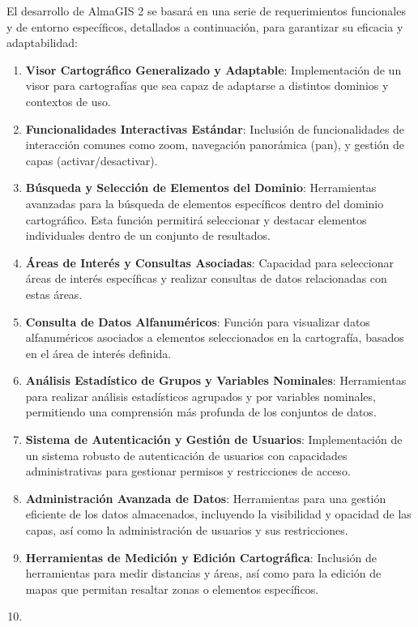El desarrollo de AlmaGIS 2 se basará en una serie de requerimientos
funcionales y de entorno específicos, detallados a continuación, para
garantizar su eficacia y adaptabilidad:

\begin{enumerate}
\def\labelenumi{\arabic{enumi}.}
\item
  \textbf{Visor Cartográfico Generalizado y Adaptable}: Implementación
  de un visor para cartografías que sea capaz de adaptarse a distintos
  dominios y contextos de uso.
\item
  \textbf{Funcionalidades Interactivas Estándar}: Inclusión de
  funcionalidades de interacción comunes como zoom, navegación
  panorámica (pan), y gestión de capas (activar/desactivar).
\item
  \textbf{Búsqueda y Selección de Elementos del Dominio}: Herramientas
  avanzadas para la búsqueda de elementos específicos dentro del dominio
  cartográfico. Esta función permitirá seleccionar y destacar elementos
  individuales dentro de un conjunto de resultados.
\item
  \textbf{Áreas de Interés y Consultas Asociadas}: Capacidad para
  seleccionar áreas de interés específicas y realizar consultas de datos
  relacionadas con estas áreas.
\item
  \textbf{Consulta de Datos Alfanuméricos}: Función para visualizar
  datos alfanuméricos asociados a elementos seleccionados en la
  cartografía, basados en el área de interés definida.
\item
  \textbf{Análisis Estadístico de Grupos y Variables Nominales}:
  Herramientas para realizar análisis estadísticos agrupados y por
  variables nominales, permitiendo una comprensión más profunda de los
  conjuntos de datos.
\item
  \textbf{Sistema de Autenticación y Gestión de Usuarios}:
  Implementación de un sistema robusto de autenticación de usuarios con
  capacidades administrativas para gestionar permisos y restricciones de
  acceso.
\item
  \textbf{Administración Avanzada de Datos}: Herramientas para una
  gestión eficiente de los datos almacenados, incluyendo la visibilidad
  y opacidad de las capas, así como la administración de usuarios y sus
  restricciones.
\item
  \textbf{Herramientas de Medición y Edición Cartográfica}: Inclusión de
  herramientas para medir distancias y áreas, así como para la edición
  de mapas que permitan resaltar zonas o elementos específicos.
\item

\end{enumerate}
